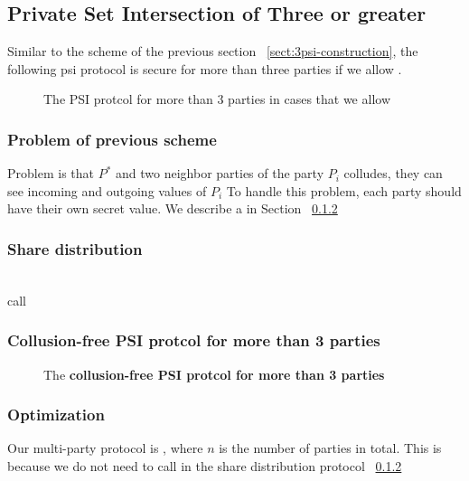 \subsection{Private Set Intersection of Three or greater}
\label{sect:npsi-construction}

Similar to the scheme of the previous section ~\ref{sect:3psi-construction}, the following psi protocol is secure for more than three parties if we allow . 

\begin{figure}[h]\centering
{}
\caption{The PSI protcol for more than 3 parties in cases that we allow }
\label{fig:npsicollud}
\end{figure}

\subsubsection{Problem of previous scheme}
Problem is that $P^*$ and two neighbor parties of the party $P_i$ colludes, they can see incoming and outgoing values of $P_i$  To handle this problem, each party should have their own secret value. We describe a  in Section ~\ref{sect:share}

\subsubsection{Share distribution}
\label{sect:share}

		 \\
		 call \todo{\SSOT} \\

\subsubsection{Collusion-free PSI protcol for more than 3 parties}
\begin{figure}[h]\centering
{}
\caption{The \bf{collusion-free} PSI protcol for more than 3 parties}
\label{fig:npsicollud}
\end{figure}

\subsubsection{Optimization}
Our multi-party protocol is , where $n$ is the number of parties in total. This is because we do not need to call \SSOT in the share distribution protocol  ~\ref{sect:share}
